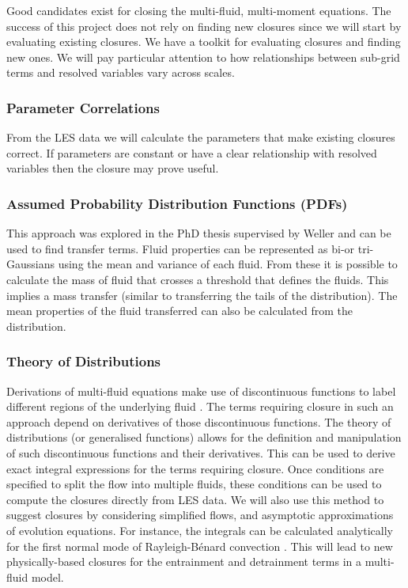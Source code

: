 \documentclass[11pt,a4paper]{article}
\begin{document}
Good candidates exist for closing the multi-fluid, multi-moment equations. The success of this project does not rely on finding new closures since we will start by evaluating existing closures. We have a toolkit for evaluating closures and finding new ones. We will pay particular attention to how relationships between sub-grid terms and resolved variables vary across scales. 

\subsubsection*{Parameter Correlations}

From the LES data we will calculate the parameters that make existing closures correct. If  parameters are constant or have a clear relationship with resolved variables then the closure may prove useful.

\subsubsection*{Assumed Probability Distribution Functions (PDFs)}

This approach was explored in the PhD thesis \cite{McIn20} supervised by Weller and can be used to find transfer terms. Fluid properties can be represented as bi-or tri-Gaussians using the mean and variance of each fluid. From these it is possible to calculate the mass of fluid that crosses a threshold that defines the fluids. This implies a mass transfer (similar to transferring the tails of the distribution). The mean properties of the fluid transferred can also be calculated from the distribution. 

\subsubsection*{Theory of Distributions}

Derivations of multi-fluid equations make use of discontinuous functions to label different regions of the underlying fluid \cite[]{Dopa77,TWV+18}. The terms requiring closure in such an approach depend on derivatives of those discontinuous functions. The theory of distributions (or generalised functions) \cite[]{Schw08} allows for the definition and manipulation of such discontinuous functions and their derivatives. This can be used to derive exact integral expressions for the terms requiring closure. Once conditions are specified to split the flow into multiple fluids, these conditions can be used to compute the closures directly from LES data. We will also use this method to suggest closures by considering simplified flows, and asymptotic approximations of evolution equations. For instance, the integrals can be calculated analytically for the first normal mode of Rayleigh-B\'{e}nard convection  \cite[]{SWCM2x}. This will lead to new physically-based closures for the entrainment and detrainment terms in a multi-fluid model. 
\end{document}
